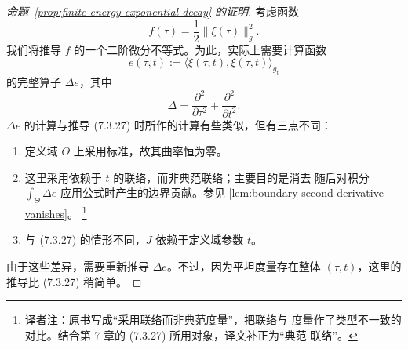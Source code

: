 \begin{proof}[命题~\ref{prop:finite-energy-exponential-decay} 的证明]
考虑函数
\[
  f(\tau)=\frac12\|\xi(\tau)\|_g^2.
\]
我们将推导 $f$ 的一个二阶微分不等式。为此，实际上需要计算函数
\[
  e(\tau,t):=\langle\xi(\tau,t),\xi(\tau,t)\rangle_{g_t}
\]
的完整\personLaplace{}算子 $\Delta e$，其中
\[
  \Delta=\frac{\partial^2}{\partial\tau^2}
         +\frac{\partial^2}{\partial t^2}.
\]
$\Delta e$ 的计算与推导 (7.3.27) 时所作的计算有些类似，但有三点不同：
\begin{enumerate}[label=(\arabic*)]
  \item 定义域 $\Theta$ 上采用标准\termFlatCylindricalMetric{}，故其曲率恒为零。
  \item 这里采用依赖于 $t$ 的\personLeviCivita{}联络，而非典范联络；主要目的是消去
  随后对积分 $\int_\Theta\Delta e$ 应用\personGreen{}公式时产生的边界贡献。参见
  \cref{lem:boundary-second-derivative-vanishes}。
  \footnote{译者注：原书写成“采用\personLeviCivita{}联络而非典范度量”，把联络与
  度量作了类型不一致的对比。结合第 7 章的 (7.3.27) 所用对象，译文补正为“典范
  联络”。}
  \item 与 (7.3.27) 的情形不同，$J$ 依赖于定义域参数 $t$。
\end{enumerate}
由于这些差异，需要重新推导 $\Delta e$。不过，因为平坦度量存在整体\termIsothermalCoordinates{} $(\tau,t)$，这里的推导比 (7.3.27) 稍简单。


\end{proof}
